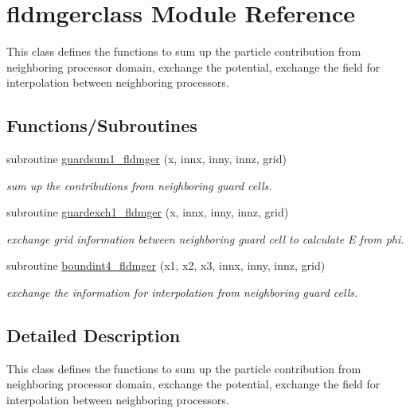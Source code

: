 \hypertarget{namespacefldmgerclass}{}\section{fldmgerclass Module Reference}
\label{namespacefldmgerclass}


This class defines the functions to sum up the particle contribution from neighboring processor domain, exchange the potential, exchange the field for interpolation between neighboring processors.  


\subsection*{Functions/\+Subroutines}
\begin{DoxyCompactItemize}
\item 
subroutine \mbox{\hyperlink{namespacefldmgerclass_a54886b0763b8458a0560ccf7087b07f1}{guardsum1\+\_\+fldmger}} (x, innx, inny, innz, grid)
\begin{DoxyCompactList}\small\item\em sum up the contributions from neighboring guard cells. \end{DoxyCompactList}\item 
subroutine \mbox{\hyperlink{namespacefldmgerclass_a028236bf0d8419b6f75a7fb28eb7226b}{guardexch1\+\_\+fldmger}} (x, innx, inny, innz, grid)
\begin{DoxyCompactList}\small\item\em exchange grid information between neighboring guard cell to calculate E from phi. \end{DoxyCompactList}\item 
subroutine \mbox{\hyperlink{namespacefldmgerclass_a490fceb1792fb1664488b1394dcff5f0}{boundint4\+\_\+fldmger}} (x1, x2, x3, innx, inny, innz, grid)
\begin{DoxyCompactList}\small\item\em exchange the information for interpolation from neighboring guard cells. \end{DoxyCompactList}\end{DoxyCompactItemize}


\subsection{Detailed Description}
This class defines the functions to sum up the particle contribution from neighboring processor domain, exchange the potential, exchange the field for interpolation between neighboring processors. 


